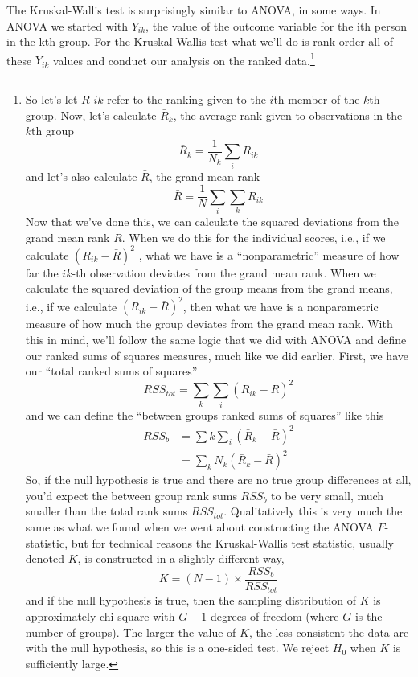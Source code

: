 \documentclass[
  a4paper,
]{book}
\begin{document}
The Kruskal-Wallis test is surprisingly similar to ANOVA, in some ways.
In ANOVA we started with \(Y_{ik}\), the value of the outcome variable
for the ith person in the kth group. For the Kruskal-Wallis test what
we'll do is rank order all of these \(Y_{ik}\) values and conduct our
analysis on the ranked data.\footnote{So let's let \(R\_{ik}\) refer to
  the ranking given to the \(i\)th member of the \(k\)th group. Now,
  let's calculate \(\bar{R}_k\), the average rank given to observations
  in the \(k\)th group \[\bar{R}_k=\frac{1}{N_k}\sum_i R_{ik}\] and
  let's also calculate \(\bar{R}\), the grand mean rank
  \[\bar{R}=\frac{1}{N}\sum_i\sum_k R_{ik}\] Now that we've done this,
  we can calculate the squared deviations from the grand mean rank
  \(\bar{R}\). When we do this for the individual scores, i.e., if we
  calculate \((R_{ik} - \bar{R})^2\) , what we have is a
  ``nonparametric'' measure of how far the \(ik\)-th observation
  deviates from the grand mean rank. When we calculate the squared
  deviation of the group means from the grand means, i.e., if we
  calculate \((R_{ik} - \bar{R})^2\), then what we have is a
  nonparametric measure of how much the group deviates from the grand
  mean rank. With this in mind, we'll follow the same logic that we did
  with ANOVA and define our ranked sums of squares measures, much like
  we did earlier. First, we have our ``total ranked sums of squares''
  \[RSS_{tot}=\sum_k\sum_i (R_{ik}-\bar{R})^2\] and we can define the
  ``between groups ranked sums of squares'' like this
  \[\begin{aligned} RSS_{b}& =\sum{k}\sum_{i}(\bar{R}_{k}-\bar{R})^2 \\ &= \sum_{k} N_k (\bar{R}_{k}-\bar{R})^2 \end{aligned}\]
  So, if the null hypothesis is true and there are no true group
  differences at all, you'd expect the between group rank sums \(RSS_b\)
  to be very small, much smaller than the total rank sums \(RSS_{tot}\).
  Qualitatively this is very much the same as what we found when we went
  about constructing the ANOVA \(F\)-statistic, but for technical
  reasons the Kruskal-Wallis test statistic, usually denoted \(K\), is
  constructed in a slightly different way,
  \[K=(N-1) \times \frac{RSS_b}{RSS_{tot}}\] and if the null hypothesis
  is true, then the sampling distribution of \(K\) is approximately
  chi-square with \(G-1\) degrees of freedom (where \(G\) is the number
  of groups). The larger the value of \(K\), the less consistent the
  data are with the null hypothesis, so this is a one-sided test. We
  reject \(H_0\) when \(K\) is sufficiently large.}
\end{document}
